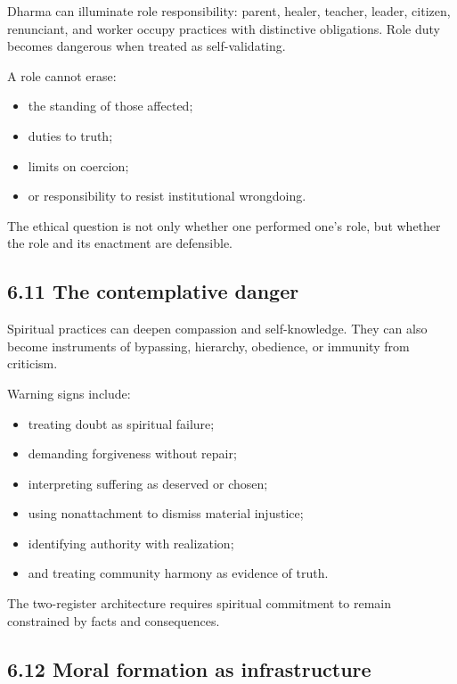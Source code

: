 \documentclass[
  11pt,
]{article}
\providecommand{\tightlist}{%
  \setlength{\itemsep}{0pt}\setlength{\parskip}{0pt}}
\begin{document}
Dharma can illuminate role responsibility: parent, healer, teacher,
leader, citizen, renunciant, and worker occupy practices with
distinctive obligations. Role duty becomes dangerous when treated as
self-validating.

A role cannot erase:

\begin{itemize}
\tightlist
\item
  the standing of those affected;
\item
  duties to truth;
\item
  limits on coercion;
\item
  or responsibility to resist institutional wrongdoing.
\end{itemize}

The ethical question is not only whether one performed one's role, but
whether the role and its enactment are defensible.

\subsection{6.11 The contemplative
danger}\label{the-contemplative-danger}

Spiritual practices can deepen compassion and self-knowledge. They can
also become instruments of bypassing, hierarchy, obedience, or immunity
from criticism.

Warning signs include:

\begin{itemize}
\tightlist
\item
  treating doubt as spiritual failure;
\item
  demanding forgiveness without repair;
\item
  interpreting suffering as deserved or chosen;
\item
  using nonattachment to dismiss material injustice;
\item
  identifying authority with realization;
\item
  and treating community harmony as evidence of truth.
\end{itemize}

The two-register architecture requires spiritual commitment to remain
constrained by facts and consequences.

\subsection{6.12 Moral formation as
infrastructure}\label{moral-formation-as-infrastructure}
\end{document}
